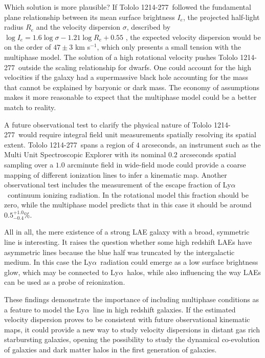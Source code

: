 \documentclass[a4paper, usenatbib, 12pt]{article}
\newcommand{\tol}{Tololo 1214-277}
\newcommand{\lya}{Ly$\alpha$}
\newcommand{\kms}{km s$^{-1}$}
\begin{document}
{Which solution is more plausible? If \tol\ followed the fundamental
plane relationship between its mean surface brightness $I_e$, the
projected half-light radius $R_e$ and the velocity dispersion
$\sigma$, described by $\log I_e=1.6 \log\sigma - 1.21\log R_e +
0.55$ \cite{2009ApJ...698.1590G,2011ApJ...726..108T},  
the expected velocity dispersion would be on the order of $47\pm 3$
\kms, which only presents a small tension with the multiphase model.   
The solution of a high rotational velocity pushes \tol\ outside the
scaling relationship for dwarfs. One could account for the high
velocities if the galaxy had a supermassive black hole accounting for
the mass that cannot be explained by baryonic or dark mass. The economy of
assumptions makes it more reasonable to expect that the multiphase
model could be a better match to reality.

A future observational test to clarify the physical nature of
\tol\ would require integral field unit measurements spatially
resolving its spatial extent. 
\tol\ spans a region of $4$ arcseconds,
an instrument such as the Multi Unit Spectroscopic Explorer with its
nominal $0.2$ arcseconds spatial sampling over a $1.0$ arcminute field
in wide-field mode could provide a coarse mapping of different
ionization lines to infer a kinematic map.
Another observational test includes the measurement of the escape
fraction of \lya\ continuum ionizing radiation. 
In the rotational model this fraction should be zero, while
the multiphase model predicts that in this case it should be around
$0.5^{+1.0}_{-0.4}$\%. 

All in all, the mere existence of a strong LAE galaxy with a broad,
symmetric line is interesting.
It raises the question whether some high redshift LAEs have asymmetric
lines because the blue half was truncated by the intergalactic medium.
In this case the \lya\ radiation could emerge as a low surface
brightness glow, which may be connected to \lya\ halos, while also
influencing the way LAEs can be used as a probe of reionization. 

These findings demonstrate the importance of including multiphase
conditions as a feature to model the \lya\ line in high redshift
galaxies.
If the estimated velocity dispersion proves to be consistent with
future observational kinematic maps, it could provide a new way to
study velocity dispersions in distant gas rich starbursting galaxies, 
opening the possibility to study the dynamical co-evolution of
galaxies and dark matter halos in the first generation of galaxies.  

}
\end{document}
